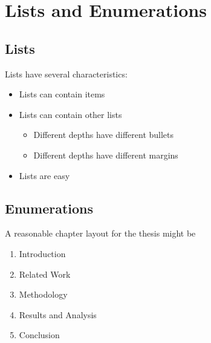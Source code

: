 \chapter{Lists and Enumerations}

\section{Lists}

Lists have several characteristics:

\begin{itemize}
\item Lists can contain items
\item Lists can contain other lists
\begin{itemize}
\item Different depths have different bullets
\item Different depths have different margins
\end{itemize}
\item Lists are easy
\end{itemize}

\section{Enumerations}

A reasonable chapter layout for the thesis might be

\begin{enumerate}
\item Introduction
\item Related Work
\item Methodology
\item Results and Analysis
\item Conclusion
\end{enumerate}